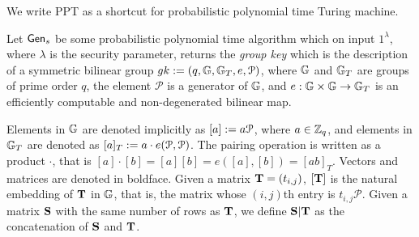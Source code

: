 We write PPT as a shortcut for probabilistic polynomial time Turing machine.

Let $\mathsf{Gen}_s$ be some probabilistic polynomial time algorithm which on input $1^{\lambda}$, where $\lambda$ is the security parameter, returns the \emph{group key} which is the description of a symmetric bilinear group $gk:=(q,\mathbb{G},\mathbb{G}_T,e,\mathcal{P})$, where $\mathbb{G}$
and $\mathbb{G}_T$ are groups of prime order $q$, the element $\mathcal{P}$ is a generator of 
$\mathbb{G}$, and $e:\mathbb{G}\times\mathbb{G}\to\mathbb{G}_T$ is an efficiently computable and non-degenerated bilinear map.

Elements in $\mathbb{G}$ are denoted implicitly as $[a]:=a \mathcal{P}$, where $a\in\mathbb{Z}_q$, and elements in $\mathbb{G}_T$ are denoted as $[a]_T:=a\cdot e(\mathcal{P},\mathcal{P})$. 
The pairing operation is written as a product $\cdot$, that is $[a] \cdot [b]=[a] [b]=e([a],[b])=[ab]_T$. Vectors and matrices are denoted in boldface. Given a matrix $\mathbf{{T}}=(t_{i,j})$, $[\mathbf{{T}}]$ is
the natural embedding of $\mathbf{{T}}$ in $\mathbb{G}$, that is, the matrix whose $(i,j)$th entry is $t_{i,j}\mathcal{P}$. Given a matrix $\mathbf{{S}}$ with the same number of rows as $\mathbf{{T}}$, we define $\mathbf{{S}}|\mathbf{{T}}$ as the concatenation of $\mathbf{{S}}$ and $\mathbf{{T}}$.